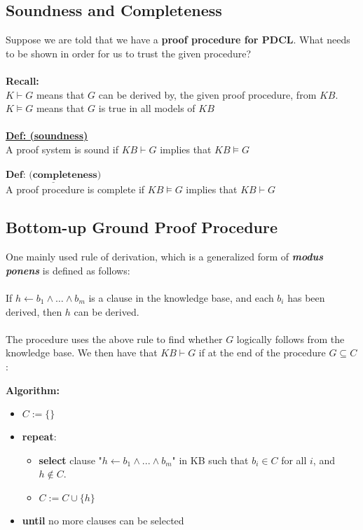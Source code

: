 \documentclass{article}
\def\blu#1{{\color{blu}#1}}
\begin{document}
\subsection*{Soundness and Completeness}
Suppose we are told that we have a \textbf{\blu{proof procedure for PDCL}}. What needs to be shown in order for us to trust the given procedure? \\
\\
\textbf{Recall:} \\
$ K \vdash G $ means that $ G $ can be derived by, the given proof procedure, from $ KB $.\\
$ K \vDash G $ means that $ G $ is true in all models of $ KB $\\
\\
\underline{\textbf{Def: (soundness)}}\\
A proof system is \blu{sound} if $ KB \vdash G $ implies that $ KB \vDash G $\\
\\
$\underline{\textbf{Def: (completeness)}}$\\
A proof procedure is \blu{complete} if $ KB \vDash G $ implies that $ KB \vdash G $


\subsection*{Bottom-up Ground Proof Procedure}
One mainly used \blu{rule of derivation}, which is a generalized form of \textbf{\textit{modus ponens}} is defined as follows:\\
\\
If $ h \leftarrow b_1 \land \dots \land b_m $ is a clause in the knowledge base, and each $ b_i $ has been derived, then $ h $ can be derived. \\
\\
The procedure uses the above rule to find whether $ G $ logically follows from the knowledge base. We then have that \blu{$ KB \vdash G $ if at the end of the procedure $ G \subseteq C $}:
\begin{siderules}
	\textbf{Algorithm:}
\begin{itemize}[label = ]
\item $ C := \{\} $
\item \textbf{repeat}:
\begin{itemize}[label = ]
	\item 	\textbf{select} clause "$ h \leftarrow b_1 \land ... \land b_m $" in KB such that $ b_i \in C $ for all $ i $, and $ h \notin C $. 
	\item $ C := C \cup \{h\} $
\end{itemize}
\item \textbf{until} no more clauses can be selected
\end{itemize}
\end{siderules}
\end{document}
